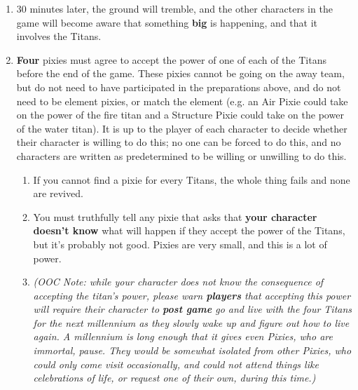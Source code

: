\documentclass[green]{PP}
\begin{document}
\begin{enumerate}
	\item 30 minutes later, the ground will tremble, and the other characters in the game will become aware that something \textbf{big} is happening, and that it involves the Titans.
	\item \textbf{Four} pixies must agree to accept the power of one of each of the Titans before the end of the game. These pixies cannot be going on the away team, but do not need to have participated in the preparations above, and do not need to be element pixies, or match the element (e.g. an Air Pixie could take on the power of the fire titan and a Structure Pixie could take on the power of the water titan). It is up to the player of each character to decide whether their character is willing to do this; no one can be forced to do this, and no characters are written as predetermined to be willing or unwilling to do this.
	\begin{enumerate}
		\item If you cannot find a pixie for every Titans, the whole thing fails and none are revived.
		\item You must truthfully tell any pixie that asks that \textbf{your character doesn’t know }what will happen if they accept the power of the Titans, but it’s probably not good. Pixies are very small, and this is a lot of power.
		\item \textit{(OOC Note: while your character does not know the consequence of accepting the titan’s power, please warn \textbf{players} that accepting this power will require their character to \textbf{post game} go and live with the four Titans for the next millennium as they slowly wake up and figure out how to live again. A millennium is long enough that it gives even Pixies, who are immortal, pause. They would be somewhat isolated from other Pixies, who could only come visit occasionally, and could not attend things like celebrations of life, or request one of their own, during this time.) }
	\end{enumerate}
\end{enumerate}
\end{document}
